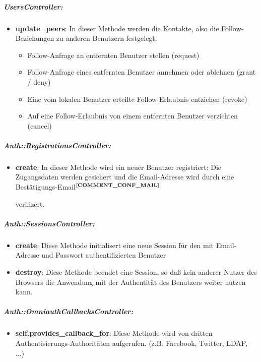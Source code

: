 \subparagraph{UsersController:}
\begin{itemize}[leftmargin=*,noitemsep,topsep=1ex,parsep=0pt,partopsep=0pt]
\item \textbf{update\_peers}: In dieser Methode werden die Kontakte, also die Follow-Beziehungen zu anderen Benutzern festgelegt.
  \begin{itemize}[leftmargin=*,noitemsep,topsep=1ex,parsep=0pt,partopsep=0pt]
    \item Follow-Anfrage an entfernten Benutzer stellen (request)
    \item Follow-Anfrage eines entfernten Benutzer annehmen oder ablehnen (grant / deny)
    \item Eine vom lokalen Benutzer erteilte Follow-Erlaubnis entziehen (revoke)
    \item Auf eine Follow-Erlaubnis von einem entfernten Benutzer verzichten (cancel)
  \end{itemize}
\end{itemize}
\subparagraph{Auth::RegistrationsController:}
\begin{itemize}[leftmargin=*,noitemsep,topsep=1ex,parsep=0pt,partopsep=0pt]
\item \textbf{create}: In dieser Methode wird ein neuer Benutzer registriert: Die Zugangsdaten werden gesichert und die Email-Adresse wird durch eine Bestätigungs-Email$^{\textbf{\ref{COMMENT_CONF_MAIL}}}$%
\addtocounter{footnote}{1}%
verifizert.
\end{itemize}
\subparagraph{Auth::SessionsController:}
\begin{itemize}[leftmargin=*,noitemsep,topsep=1ex,parsep=0pt,partopsep=0pt]
\item \textbf{create}: Diese Methode initialisert eine neue Session für den mit Email-Adresse und Passwort authentifizierten Benutzer 
\item \textbf{destroy}: Diese Methode beendet eine Session, so daß kein anderer Nutzer des Browsers die Anwendung mit der Authentität des Benutzers weiter nutzen kann.
\end{itemize}
\subparagraph{Auth::OmniauthCallbacksController:}
\begin{itemize}[leftmargin=*,noitemsep,topsep=1ex,parsep=0pt,partopsep=0pt]
\item \textbf{self.provides\_callback\_for}: Diese Methode wird von dritten Authentisierungs-Authoritäten aufgerufen. (z.B. Facebook, Twitter, LDAP, ...)
\end{itemize}
